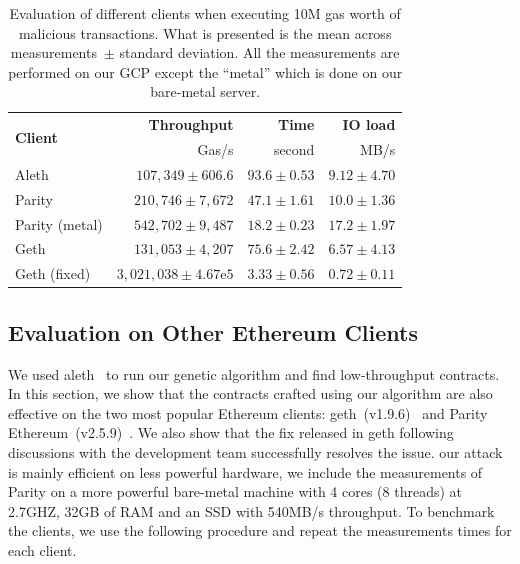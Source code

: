   \begin{table}
    \centering
    \setlength{\tabcolsep}{3pt}
    \caption[Evaluation of different Ethereum clients]{Evaluation of different clients when executing 10M gas worth of malicious transactions. What is presented is the mean across  measurements~$\pm$ standard deviation. All the measurements are performed on our GCP except the ``metal'' which is done on our bare-metal server.}
    \label{tab:clients-evaluation}
    \begin{tabular}{l r r r}
      \toprule
      \multirow{2}{*}{\textbf{Client}} & \textbf{Throughput}             & \textbf{Time}   & \textbf{IO load} \\
                                       & Gas/s                           & second          & MB/s             \\
      \midrule
      Aleth                            & $107,349\pm 606.6$              & $93.6\pm 0.53$  & $9.12\pm 4.70$   \\
      Parity                           & $210,746\pm 7,672$              & $47.1\pm 1.61$  & $10.0\pm 1.36$   \\
      Parity (\small{metal})           & $542,702\pm 9,487$              & $18.2\pm 0.23$  & $17.2\pm 1.97$   \\
      Geth                             & $131,053\pm 4,207$              & $75.6\pm 2.42$  & $6.57\pm 4.13$   \\
      Geth (\small{fixed})             & $3,021,038 \pm 4.67\mathrm{e}5$ & $3.33 \pm 0.56$ & $0.72\pm 0.11$   \\
      \bottomrule
    \end{tabular}
  \end{table}

  \subsection{Evaluation on Other Ethereum Clients}
  We used aleth~\cite{aleth} to run our genetic algorithm and find low-throughput contracts. In this section, we show that the contracts crafted using our algorithm are also effective on the two most popular Ethereum clients: geth~(v1.9.6)~\cite{geth} and Parity Ethereum~(v2.5.9)~\cite{parity-ethereum}. We also show that the fix released in geth following discussions with the development team successfully resolves the issue. our attack is mainly efficient on less powerful hardware, we include the measurements of Parity on a more powerful bare-metal machine with 4 cores (8 threads) at 2.7GHZ, 32GB of RAM and an SSD with 540MB/s throughput.
  To benchmark the clients, we use the following procedure and repeat the measurements  times for each client.


